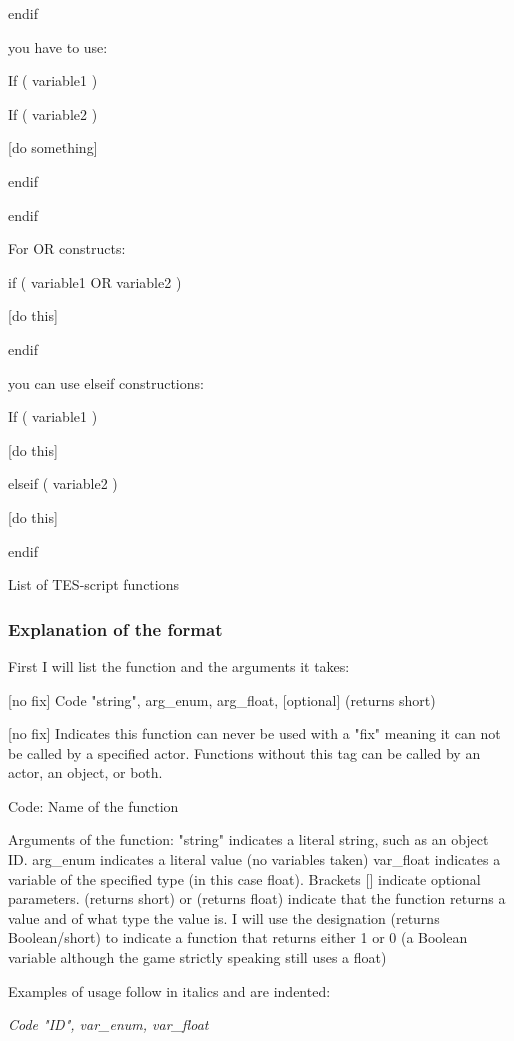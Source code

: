 \documentclass[
]{article}
\begin{document}
endif

you have to use:

If ( variable1 )

If ( variable2 )

{[}do something{]}

endif

endif

For OR constructs:

if ( variable1 OR variable2 )

{[}do this{]}

endif

you can use elseif constructions:

If ( variable1 )

{[}do this{]}

elseif ( variable2 )

{[}do this{]}

endif

\protect\hypertarget{_Toc53412583}{}{}List of TES-script functions

\hypertarget{explanation-of-the-format}{%
\subsubsection{Explanation of the
format}\label{explanation-of-the-format}}

First I will list the function and the arguments it takes:

{[}no fix{]} Code "string", arg\_enum, arg\_float, {[}optional{]}
(returns short)

{[}no fix{]} Indicates this function can never be used with a "fix"
meaning it can not be called by a specified actor. Functions without
this tag can be called by an actor, an object, or both.

Code: Name of the function

Arguments of the function: "string" indicates a literal string, such as
an object ID. arg\_enum indicates a literal value (no variables taken)
var\_float indicates a variable of the specified type (in this case
float). Brackets {[}{]} indicate optional parameters. (returns short) or
(returns float) indicate that the function returns a value and of what
type the value is. I will use the designation (returns Boolean/short) to
indicate a function that returns either 1 or 0 (a Boolean variable
although the game strictly speaking still uses a float)

Examples of usage follow in italics and are indented:

\emph{Code "ID", var\_enum, var\_float}
\end{document}
